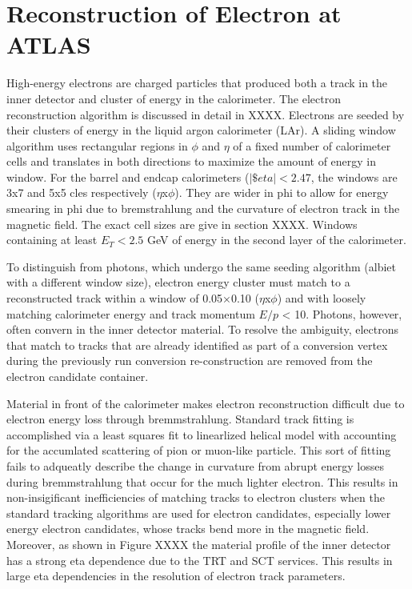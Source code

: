 \section{Reconstruction of Electron at ATLAS}

High-energy electrons are charged particles that produced both a track in the inner detector and cluster of energy in the calorimeter. The electron reconstruction algorithm is discussed in detail in XXXX. Electrons are seeded by their clusters of energy in the liquid argon calorimeter (LAr). A sliding window algorithm uses rectangular regions in $\phi$ and $\eta$ of a fixed number of calorimeter cells and translates in both directions to maximize the amount of energy in window. For the barrel and endcap calorimeters ($|\$eta| < 2.47$, the windows are 3x7 and 5x5 cles respectively ($\eta$x$\phi$). They are wider in phi to allow for energy smearing in phi due to bremstrahlung and the curvature of electron track in the magnetic field. The exact cell sizes are give in section XXXX. Windows containing at least $E_T < 2.5$ GeV of energy in the second layer of the calorimeter. 

To distinguish from photons, which undergo the same seeding algorithm (albiet with a different window size), electron energy cluster must match to a reconstructed track within a window of 0.05×0.10 ($\eta$x$\phi$) and with loosely matching calorimeter energy and track momentum $E/p$ < 10. Photons, however, often convern in the inner detector material. To resolve the ambiguity, electrons that match to tracks that are already identified as part of a conversion vertex during the previously run conversion re-construction are removed from the electron candidate container. 

Material in front of the calorimeter makes electron reconstruction difficult due to electron energy loss through bremmstrahlung. Standard track fitting is accomplished via a least squares fit to linearlized helical model with accounting for the accumlated scattering of pion or muon-like particle. This sort of fitting fails to adqueatly describe the change in curvature from abrupt energy losses during bremmstrahlung that occur for the much lighter electron. This results in non-insigificant inefficiencies of matching tracks to electron clusters when the standard tracking algorithms are used for electron candidates, especially lower energy electron candidates, whose tracks bend more in the magnetic field. Moreover, as shown in Figure XXXX the material profile of the inner detector has a strong eta dependence due to the TRT and SCT services. This results in large eta dependencies in the resolution of electron track parameters.

